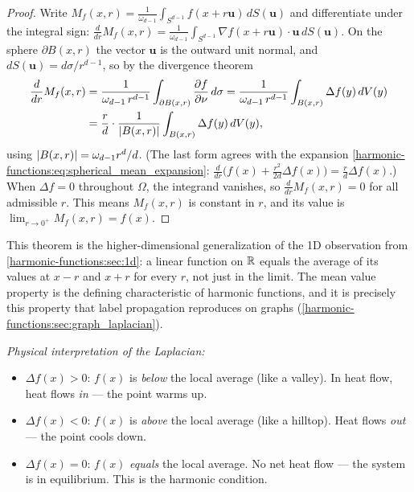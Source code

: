 \begin{notechapter}
\begin{proof}
Write $M_f(x, r) = \frac1{\omega_{d-1}}\int_{S^{d-1}}f(x + r\mathbf u)\,dS(\mathbf u)$ and differentiate under the integral sign:
$\frac{d}{dr}M_f(x, r) = \frac1{\omega_{d-1}}\int_{S^{d-1}}\nabla f(x + r\mathbf u)\cdot\mathbf u\,dS(\mathbf u)$. On the sphere $\partial B(x, r)$ the vector $\mathbf u$ is the outward
unit normal, and $dS(\mathbf u) = d\sigma/r^{d-1}$, so by the divergence theorem
\begin{align*}
\frac{d}{dr}M_f(x,r)
&= \frac{1}{\omega_{d-1}\,r^{d-1}}\int_{\partial B(x,r)}\frac{\partial f}{\partial\nu}\,d\sigma
= \frac{1}{\omega_{d-1}\,r^{d-1}}
  \int_{B(x,r)} \Delta f(y)\,dV(y)\\
&= \frac rd\cdot\frac1{\left|B(x, r)\right|}\int_{B(x,r)}\Delta f(y)\,dV(y),
\end{align*}
using $\left|B(x, r)\right| = \omega_{d-1}r^d/d$. (The last form agrees with the expansion
\eqref{harmonic-functions:eq:spherical_mean_expansion}: $\frac{d}{dr}\bigl(f(x) + \frac{r^2}{2d}\Delta f(x)\bigr) = \frac rd\Delta f(x)$.)
When $\Delta f = 0$ throughout $\Omega$, the integrand vanishes, so
$\frac{d}{dr}M_f(x,r) = 0$ for all admissible $r$. This means $M_f(x,r)$
is constant in $r$, and its value is $\lim_{r \to 0^+} M_f(x,r) = f(x)$.
\end{proof}

This theorem is the higher-dimensional generalization of the 1D observation
from \cref{harmonic-functions:sec:1d}: a linear function on $\mathbb{R}$ equals the average of
its values at $x - r$ and $x + r$ for every $r$, not just in the limit. The
mean value property is the defining characteristic of harmonic functions,
and it is precisely this property that label propagation reproduces on
graphs (\cref{harmonic-functions:sec:graph_laplacian}).

\begin{intuition}
\emph{Physical interpretation of the Laplacian:}
\begin{itemize}
    \item $\Delta f(x) > 0$: $f(x)$ is \emph{below} the local average
          (like a valley). In heat flow, heat flows \emph{in} --- the point
          warms up.
    \item $\Delta f(x) < 0$: $f(x)$ is \emph{above} the local average
          (like a hilltop). Heat flows \emph{out} --- the point cools down.
    \item $\Delta f(x) = 0$: $f(x)$ \emph{equals} the local average. No
          net heat flow --- the system is in equilibrium. This is the
          harmonic condition.
\end{itemize}
\end{intuition}


\end{notechapter}
